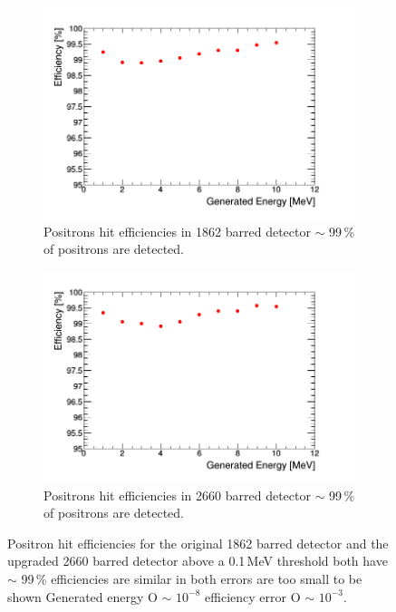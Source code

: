 \begin{figure}[!h]
\centering
\begin{subfigure}{.5\textwidth}
  \centering
  \includegraphics[width=\linewidth]{Chapter4/Figs/Raster/year1Plots/2000_1-10MeV_sec_p_spread_run.png}
  \captionsetup{width=.9\linewidth}
  \caption{Positrons hit efficiencies in 1862 barred detector $\sim$ 99\,\% of positrons are detected.}
  \label{subFig:2000_p_sec}
\end{subfigure}%
\begin{subfigure}{.5\textwidth}
  \centering
  \includegraphics[width=\linewidth]{Chapter4/Figs/Raster/year1Plots/3000_1-10MeV_sec_p_spread_run.png}
  \captionsetup{width=.9\linewidth}
  \caption{Positrons hit efficiencies in 2660 barred detector $\sim$ 99\,\% of positrons are detected.}
  \label{subFig:3000_p_sec}
\end{subfigure}
\caption{Positron hit efficiencies for the original 1862 barred detector and the upgraded 2660 barred detector above a 0.1\,MeV threshold both have $\sim$ 99\,\% efficiencies are similar in both errors are too small to be shown Generated energy O $\sim$ $10^{-8}$ efficiency error O $\sim$ $10^{-3}$.}
\label{fig:2000_3000_p_secs}
\end{figure}


